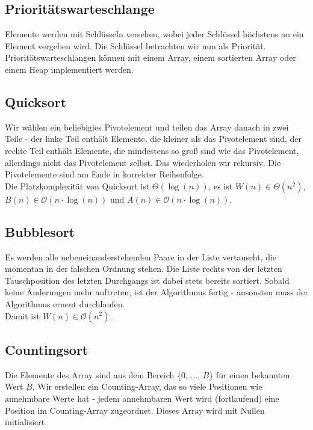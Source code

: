 \documentclass[12pt]{article}
\begin{document}
\subsection{Prioritätswarteschlange}

Elemente werden mit Schlüsseln versehen, wobei jeder Schlüssel höchstens an ein Element vergeben wird. Die Schlüssel betrachten wir nun als Priorität. Prioritätswarteschlangen können mit einem Array, einem sortierten Array oder einem Heap implementiert werden.

\subsection{Quicksort}

Wir wählen ein beliebigies Pivotelement und teilen das Array danach in zwei Teile - der linke Teil enthält Elemente, die kleiner als das Pivotelement sind, der rechte Teil enthält Elemente, die mindestens so groß sind wie das Pivotelement, allerdings nicht das Pivotelement selbst. Das wiederholen wir rekursiv. Die Pivotelemente sind am Ende in korrekter Reihenfolge.\\

Die Platzkomplexität von Quicksort ist $\Theta(\log(n))$, es ist $W(n) \in \Theta(n^2)$, $B(n) \in \mathcal O(n\cdot{}\log(n))$ und $A(n) \in \mathcal O(n\cdot{}\log(n))$.

\subsection{Bubblesort}

Es werden alle nebeneinanderstehenden Paare in der Liste vertauscht, die momentan in der falschen Ordnung stehen. Die Liste rechts von der letzten Tauschposition des letzten Durchgangs ist dabei stets bereits sortiert. Sobald keine Änderungen mehr auftreten, ist der Algorithmus fertig - ansonsten muss der Algorithmus erneut durchlaufen.\\

Damit ist $W(n) \in \mathcal O(n^2)$.

\subsection{Countingsort}

Die Elemente des Array sind aus dem Bereich \{0, ..., $B$\} für einen bekannten Wert $B$. Wir erstellen ein Counting-Array, das so viele Positionen wie annehmbare Werte hat - jedem annehmbaren Wert wird (fortlaufend) eine Position im Counting-Array zugeordnet. Dieses Array wird mit Nullen initialisiert.
\end{document}
